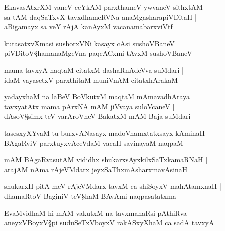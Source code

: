 \begin{shloka}
EkavasAtxrXM vaneV ceYkAM parxthameV ywvaneV sithxtAM |\\
sa tAM daqSaTxvX tavxdhameRVNa anaMgasharapiVDitaH |\\
aBigamayx sa veY rAjA kanAyxM vacanamabarxviVtf 
\end{shloka}

\begin{shloka}
kutasatxvXmasi sushorxVNi kasayx cAsi sushoVBaneV |\\
piVDitoV\S hamanaMgeVna paqcACxmi tAvxM sushoVBaneV 
\end{shloka}

\begin{shloka}
mama tavxyA haqtaM citatxM dashaRnAdeVva suMdari |\\
idaM vayasetxV parxthitaM muniVnAM citatxhArakaM
\end{shloka}

\begin{shloka}
yadayxhaM na laBeV BoVkutxM maqtaM mAmavadhAraya |\\
tavxyatAtx mama pArxNA mAM jiVvaya suloVcaneV |\\
dAsoV\S simx teV varAroVheV BakatxM mAM Baja suMdari
\end{shloka}

\begin{shloka}
tasesxyXYvaM tu burxvANasayx madoVnamxtatxsayx kAminaH |\\
BAgaRviV parxtuyxvAceVdaM vacaH savinayaM naqpaM 
\end{shloka}

\begin{shloka}
mAM BAgaRvasutAM vididhx shukarxsAyxkilxSaTxkamaRNaH |\\
arajAM nAma rAjeVMdarx jeyxSaThxmAsharxmavAsinaH 
\end{shloka}

\begin{shloka}
shukarxH pitA meV rAjeVMdarx tavxM ca shiSoyxV mahAtamxnaH |\\
dhamaRtoV BaginiV teV\S haM BAvAmi naqpasatatxma
\end{shloka}

\begin{shloka}
EvaMvidhaM hi mAM vakutxM na tavxmahaRsi pAthiRva |\\
aneyxVBoyxV\S pi suduSeTxVboyxV rakASxyXhaM ca sadA tavxyA 
\end{shloka}

